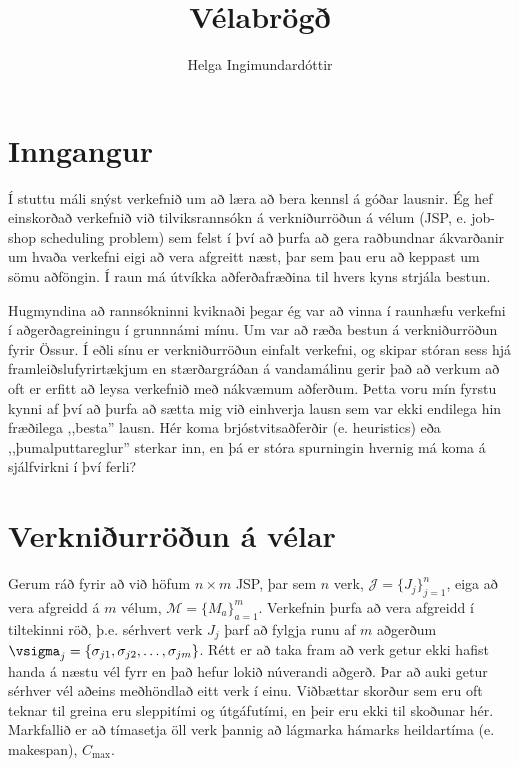 \documentclass[]{article}
\title{Vélabrögð}
\author{Helga Ingimundardóttir}
\begin{document}
\maketitle


\section{Inngangur}
Í stuttu máli snýst verkefnið um að læra að bera kennsl á góðar lausnir. 
Ég hef einskorðað verkefnið við tilviksrannsókn á verkniðurröðun á vélum (JSP, 
e. job-shop scheduling problem) 
sem felst í því að þurfa að gera raðbundnar ákvarðanir um hvaða verkefni eigi 
að vera afgreitt næst, þar sem þau eru að keppast um sömu aðföngin.
Í raun má útvíkka aðferðafræðina til hvers kyns strjála bestun. 

Hugmyndina að rannsókninni kviknaði þegar ég var að vinna í raunhæfu verkefni í 
aðgerðagreiningu í grunnnámi mínu. Um var að ræða bestun á verkniðurröðun fyrir 
Össur. Í eðli sínu er verkniðurröðun einfalt verkefni, og skipar stóran sess 
hjá framleiðslufyrirtækjum en stærðargráðan á vandamálinu gerir það að verkum 
að oft er erfitt að leysa verkefnið með nákvæmum aðferðum. 
Þetta voru mín fyrstu kynni af því að þurfa að sætta mig við einhverja lausn 
sem var ekki endilega hin fræðilega ,,besta'' lausn. 
Hér koma brjóstvitsaðferðir (e. heuristics) eða ,,þumalputtareglur'' sterkar 
inn, en þá er stóra spurningin hvernig má koma á sjálfvirkni í því ferli?

\section{Verkniðurröðun á vélar}
Gerum ráð fyrir að við höfum $n\times m$ JSP, 
þar sem $n$ verk, $\mathcal{J}=\{J_j\}_{j=1}^n$, 
eiga að vera afgreidd á $m$ vélum, $\mathcal{M}=\{M_a\}_{a=1}^m$. 
Verkefnin þurfa að vera afgreidd í tiltekinni röð, þ.e. sérhvert verk $J_j$ 
þarf að fylgja runu af $m$ aðgerðum 
$\vsigma_j=\{\sigma_{j1},\sigma_{j2},\dotsc,\sigma_{jm}\}$. 
Rétt er að taka fram að verk getur ekki hafist handa á næstu vél fyrr en það 
hefur lokið núverandi aðgerð. 
Þar að auki getur sérhver vél aðeins meðhöndlað eitt verk í einu. 
Viðbættar skorður sem eru oft teknar til greina eru sleppitími og útgáfutími, 
en þeir eru ekki til skoðunar hér.
Markfallið er að tímasetja öll verk þannig að lágmarka hámarks heildartíma (e. 
makespan), $C_{\max}$. 
\end{document}
